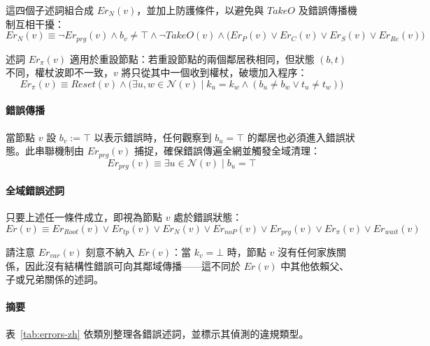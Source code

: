 \documentclass[a4paper, 12pt]{article}
\newcommand{\Neig}{\mathcal{N}}
\newcommand{\rk}{k}
\begin{document}
這四個子述詞組合成 \(Er_N(v)\)，並加上防護條件，以避免與 \(\mathit{TakeO}\) 及錯誤傳播機制互相干擾：
\begin{equation}
    Er_N(v) \equiv \neg Er_{prg}(v) \wedge b_v \neq \top \wedge \neg \mathit{TakeO}(v)
    \wedge \bigl(Er_P(v) \vee Er_C(v) \vee Er_S(v) \vee Er_{Re}(v)\bigr)
    \label{eq:zhErN}
\end{equation}

述詞 \(Er_\pi(v)\) 適用於重設節點：若重設節點的兩個鄰居秩相同，但狀態 \((b,t)\) 不同，權杖波即不一致，\(v\) 將只從其中一個收到權杖，破壞加入程序：
\begin{equation}
    Er_\pi(v) \equiv \mathit{Reset}(v) \wedge
    \bigl(\exists u, w \in \Neig(v) \mid \rk_u = \rk_w
    \wedge (b_u \neq b_w \vee t_u \neq t_w)\bigr)
\end{equation}

\paragraph*{錯誤傳播}

當節點 \(v\) 設 \(b_v:=\top\) 以表示錯誤時，任何觀察到 \(b_u=\top\) 的鄰居也必須進入錯誤狀態。此串聯機制由 \(Er_{prg}(v)\) 捕捉，確保錯誤傳遍全網並觸發全域清理：
\begin{equation}
    Er_{prg}(v) \equiv \exists u \in \Neig(v) \mid b_u = \top
    \label{eq:zhErprg}
\end{equation}

\paragraph*{全域錯誤述詞}

只要上述任一條件成立，即視為節點 \(v\) 處於錯誤狀態：
\begin{equation}
    Er(v) \equiv Er_{Root}(v) \vee Er_{tp}(v) \vee Er_N(v) \vee Er_{noP}(v)
    \vee Er_{prg}(v) \vee Er_\pi(v) \vee Er_{wait}(v)
    \label{eq:zhEr}
\end{equation}

請注意 \(Er_{var}(v)\) 刻意不納入 \(Er(v)\)：當 \(\rk_v=\bot\) 時，節點 \(v\) 沒有任何家族關係，因此沒有結構性錯誤可向其鄰域傳播——這不同於 \(Er(v)\) 中其他依賴父、子或兄弟關係的述詞。

\paragraph*{摘要}
表~\ref{tab:errors-zh} 依類別整理各錯誤述詞，並標示其偵測的違規類型。
\end{document}
